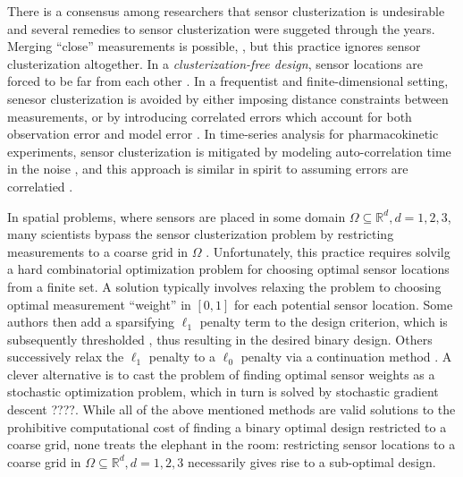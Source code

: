 There is a consensus among researchers that sensor clusterization is
undesirable \cite{fedorov1996, hooker2009, fedorov2012, Ucinski05,
  neitzel2019sparse} and several remedies to sensor clusterization
were suggeted through the years. Merging ``close'' measurements is
possible, \cite{fedorov2012}, but this practice ignores sensor
clusterization altogether. In a \emph{clusterization-free design},
sensor locations are forced to be far from each other
\cite{Ucinski05}. In a frequentist and finite-dimensional setting,
senesor clusterization is avoided by either imposing distance
constraints between measurements, or by introducing correlated errors
which account for both observation error and model error
\cite{Ucinski05}. In time-series analysis for pharmacokinetic
experiments, sensor clusterization is mitigated by modeling
auto-correlation time in the noise \cite{hooker2009}, and this
approach is similar in spirit to assuming errors are correlatied
\cite{Ucinski05}.


In spatial problems, where sensors are placed in some domain $\Omega
\subseteq \mathbb{R}^d, d=1,2,3$, many scientists bypass the sensor
clusterization problem by restricting measurements to a coarse grid in
$\Omega$ \cite{koval2020, alexanderian2021, attia2020,
  alexanderian2014, alexanderian2016,
  alexanderian2018efficient}. Unfortunately, this practice requires
solvilg a hard combinatorial optimization problem for choosing optimal
sensor locations from a finite set. A solution typically involves
relaxing the problem to choosing optimal measurement ``weight'' in
$[0,1]$ for each potential sensor location. Some authors then add a
sparsifying $\ell_1$ penalty term to the design criterion, which is
subsequently thresholded \cite{horesh2008borehole}, thus resulting in
the desired binary design. Others successively relax the $\ell_1$
penalty to a $\ell_0$ penalty via a continuation method
\cite{alexanderian2016, alexanderian2014}. A clever alternative is to
cast the problem of finding optimal sensor weights as a stochastic
optimization problem, which in turn is solved by stochastic gradient
descent \cite{attia2022stochastic}????. While all of the above
mentioned methods are valid solutions to the prohibitive computational
cost of finding a binary optimal design restricted to a coarse grid,
none treats the elephant in the room: restricting sensor locations to
a coarse grid in $\Omega \subseteq \mathbb{R}^d, d=1,2,3$ necessarily
gives rise to a sub-optimal design.

